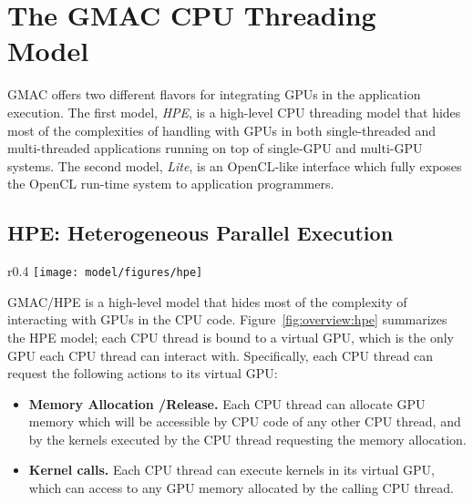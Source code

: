\section{The GMAC CPU Threading Model}

GMAC offers two different flavors for integrating GPUs in the application execution. The first 
model, \emph{HPE}, is a high\hyp{}level CPU threading model that hides most of the complexities of 
handling with GPUs in both single\hyp{}threaded and multi\hyp{}threaded applications running on top 
of single\hyp{}GPU and multi\hyp{}GPU systems. The second model, \emph{Lite}, is an OpenCL\hyp{}like 
interface which fully exposes the OpenCL run\hyp{}time system to application programmers.

\subsection{HPE: Heterogeneous Parallel Execution}

\begin{wrapfigure}{r}{0.4\linewidth}
\vspace{-20pt}
\texttt{[image: model/figures/hpe]}
\vspace{-20pt}
\caption{HPE CPU Threading model. Each CPU thread is bound to a GPU, where all operations requested 
by thr CPU thread are executed}
\label{fig:overview:hpe}
\vspace{-20pt}
\end{wrapfigure}

GMAC\slash HPE is a high\hyp{}level model that hides most of the complexity of interacting with GPUs 
in the CPU code. Figure~\ref{fig:overview:hpe} summarizes the HPE model; each CPU thread is bound to 
a virtual GPU, which is the only GPU each CPU thread can interact with. Specifically, each CPU 
thread can request the following actions to its virtual GPU:
\begin{itemize}
\item \textbf{Memory Allocation \slash Release.} Each CPU thread can allocate GPU memory which will 
be accessible by CPU code of any other CPU thread, and by the kernels executed by the CPU thread 
requesting the memory allocation.
\item \textbf{Kernel calls.} Each CPU thread can execute kernels in its virtual GPU, which can 
access to any GPU memory allocated by the calling CPU thread.
\end{itemize}


